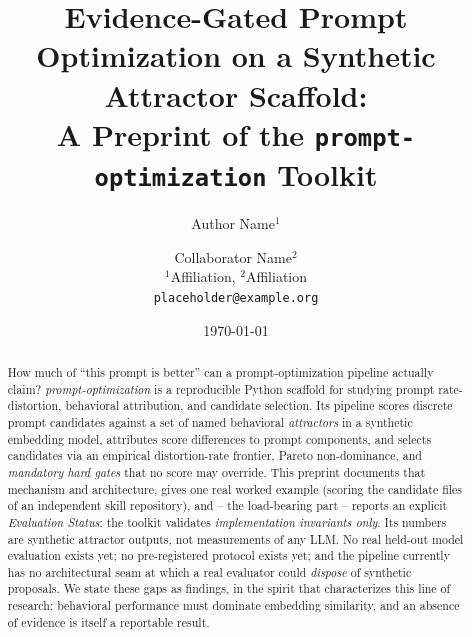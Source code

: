 \documentclass[11pt]{article}
\title{Evidence-Gated Prompt Optimization on a Synthetic Attractor Scaffold:\\
A Preprint of the \texttt{prompt-optimization} Toolkit}
\author{Author Name$^1$ \and Collaborator Name$^2$\\
\small $^1$Affiliation, $^2$Affiliation\\
\small \texttt{placeholder@example.org} %
}
\date{\today}
\begin{document}
\maketitle

\begin{abstract}
How much of ``this prompt is better'' can a prompt-optimization pipeline actually
claim? \emph{prompt-optimization} is a reproducible Python scaffold for studying
prompt rate-distortion, behavioral attribution, and candidate selection. Its
pipeline scores discrete prompt candidates against a set of named behavioral
\emph{attractors} in a synthetic embedding model, attributes score differences to
prompt components, and selects candidates via an empirical distortion-rate
frontier, Pareto non-dominance, and \emph{mandatory hard gates} that no score may
override. This preprint documents that mechanism and architecture, gives one real
worked example (scoring the candidate files of an independent skill repository),
and -- the load-bearing part -- reports an explicit \emph{Evaluation Status}: the
toolkit validates \emph{implementation invariants only}. Its numbers are synthetic
attractor outputs, not measurements of any LLM. No real held-out model evaluation
exists yet; no pre-registered protocol exists yet; and the pipeline currently has
no architectural seam at which a real evaluator could \emph{dispose} of synthetic
proposals. We state these gaps as findings, in the spirit that characterizes this
line of research: behavioral performance must dominate embedding similarity, and
an absence of evidence is itself a reportable result.
\end{abstract}














\end{document}
